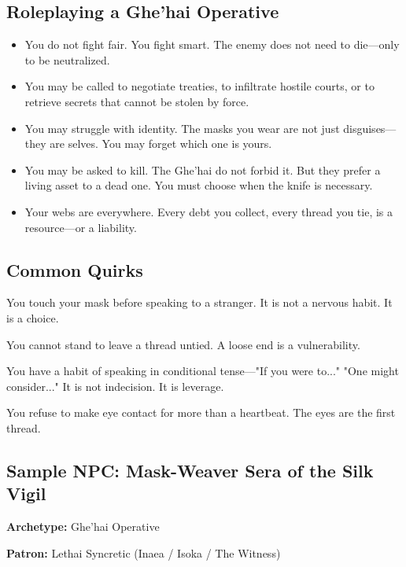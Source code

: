 \subsection{Roleplaying a Ghe'hai Operative}

\begin{itemize}
\item You do not fight fair. You fight smart. The enemy does not need to die—only to be neutralized.
\item You may be called to negotiate treaties, to infiltrate hostile courts, or to retrieve secrets that cannot be stolen by force.
\item You may struggle with identity. The masks you wear are not just disguises—they are selves. You may forget which one is yours.
\item You may be asked to kill. The Ghe'hai do not forbid it. But they prefer a living asset to a dead one. You must choose when the knife is necessary.
\item Your webs are everywhere. Every debt you collect, every thread you tie, is a resource—or a liability.
\end{itemize}

\subsection{Common Quirks}

\begin{dice}
\item You touch your mask before speaking to a stranger. It is not a nervous habit. It is a choice.
\item You cannot stand to leave a thread untied. A loose end is a vulnerability.
\item You have a habit of speaking in conditional tense—"If you were to..." "One might consider..." It is not indecision. It is leverage.
\item You refuse to make eye contact for more than a heartbeat. The eyes are the first thread.
\end{dice}

\subsection{Sample NPC: Mask-Weaver Sera of the Silk Vigil}

\textbf{Archetype:} Ghe'hai Operative

\textbf{Patron:} Lethai Syncretic (Inaea / Isoka / The Witness)

